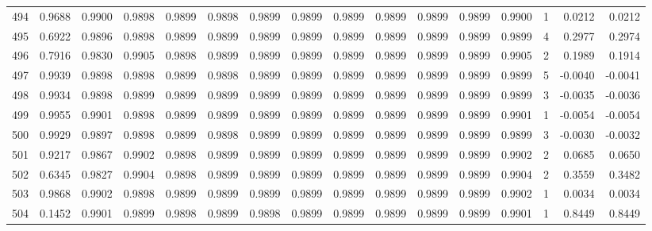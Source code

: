 \begin{tabular}{lrrrrrrrrrrrrrrr}
494 &      0.9688 &  0.9900 &  0.9898 &  0.9899 &  0.9898 &  0.9899 &  0.9899 &  0.9899 &  0.9899 &  0.9899 &   0.9899 &     0.9900 &      1 &                    0.0212 &                     0.0212 \\
495 &      0.6922 &  0.9896 &  0.9898 &  0.9899 &  0.9899 &  0.9899 &  0.9899 &  0.9899 &  0.9899 &  0.9899 &   0.9899 &     0.9899 &      4 &                    0.2977 &                     0.2974 \\
496 &      0.7916 &  0.9830 &  0.9905 &  0.9898 &  0.9899 &  0.9899 &  0.9899 &  0.9899 &  0.9899 &  0.9899 &   0.9899 &     0.9905 &      2 &                    0.1989 &                     0.1914 \\
497 &      0.9939 &  0.9898 &  0.9898 &  0.9899 &  0.9898 &  0.9899 &  0.9899 &  0.9899 &  0.9899 &  0.9899 &   0.9899 &     0.9899 &      5 &                   -0.0040 &                    -0.0041 \\
498 &      0.9934 &  0.9898 &  0.9899 &  0.9899 &  0.9899 &  0.9899 &  0.9899 &  0.9899 &  0.9899 &  0.9899 &   0.9899 &     0.9899 &      3 &                   -0.0035 &                    -0.0036 \\
499 &      0.9955 &  0.9901 &  0.9898 &  0.9899 &  0.9899 &  0.9899 &  0.9899 &  0.9899 &  0.9899 &  0.9899 &   0.9899 &     0.9901 &      1 &                   -0.0054 &                    -0.0054 \\
500 &      0.9929 &  0.9897 &  0.9898 &  0.9899 &  0.9898 &  0.9899 &  0.9899 &  0.9899 &  0.9899 &  0.9899 &   0.9899 &     0.9899 &      3 &                   -0.0030 &                    -0.0032 \\
501 &      0.9217 &  0.9867 &  0.9902 &  0.9898 &  0.9899 &  0.9899 &  0.9899 &  0.9899 &  0.9899 &  0.9899 &   0.9899 &     0.9902 &      2 &                    0.0685 &                     0.0650 \\
502 &      0.6345 &  0.9827 &  0.9904 &  0.9898 &  0.9899 &  0.9899 &  0.9899 &  0.9899 &  0.9899 &  0.9899 &   0.9899 &     0.9904 &      2 &                    0.3559 &                     0.3482 \\
503 &      0.9868 &  0.9902 &  0.9898 &  0.9899 &  0.9899 &  0.9899 &  0.9899 &  0.9899 &  0.9899 &  0.9899 &   0.9899 &     0.9902 &      1 &                    0.0034 &                     0.0034 \\
504 &      0.1452 &  0.9901 &  0.9899 &  0.9898 &  0.9899 &  0.9898 &  0.9899 &  0.9899 &  0.9899 &  0.9899 &   0.9899 &     0.9901 &      1 &                    0.8449 &                     0.8449 \\

\end{tabular}
